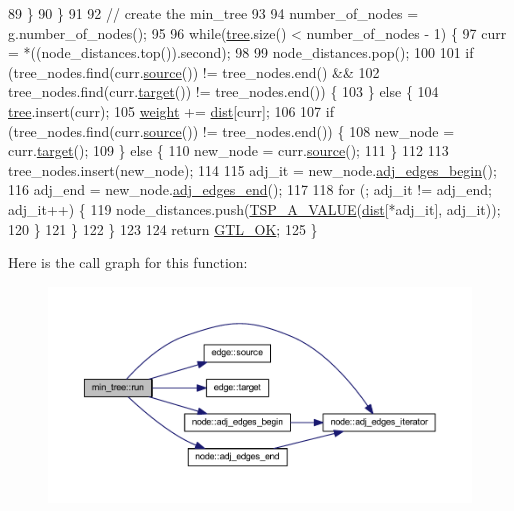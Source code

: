 \begin{DoxyCode}
89     \}  
90     \}
91 
92     \textcolor{comment}{// create the min\_tree}
93 
94     number\_of\_nodes = \mbox{\hyperlink{rings_8cpp_aa9df5aa3976a89a96a5f1c7611d42938}{g}}.number\_of\_nodes();
95 
96     \textcolor{keywordflow}{while}(\mbox{\hyperlink{classmin__tree_a138e9248f851ee2562df6644626a1f0b}{tree}}.size() < number\_of\_nodes - 1) \{ 
97     curr = *((node\_distances.top()).second);
98   
99     node\_distances.pop();
100  
101     \textcolor{keywordflow}{if} (tree\_nodes.find(curr.\mbox{\hyperlink{classedge_ae82d5701f7e6f71edc3c8b0e34bcd2b7}{source}}()) != tree\_nodes.end() && 
102         tree\_nodes.find(curr.\mbox{\hyperlink{classedge_a97563b611261478ee19c6ce055f1a3ee}{target}}()) != tree\_nodes.end()) \{
103     \} \textcolor{keywordflow}{else} \{
104         \mbox{\hyperlink{classmin__tree_a138e9248f851ee2562df6644626a1f0b}{tree}}.insert(curr);
105         \mbox{\hyperlink{classmin__tree_a52112da027b950d45c177117444c5010}{weight}} += \mbox{\hyperlink{classmin__tree_ae612767aa8e3eb3bedd1dadd7c68f99c}{dist}}[curr];
106 
107         \textcolor{keywordflow}{if} (tree\_nodes.find(curr.\mbox{\hyperlink{classedge_ae82d5701f7e6f71edc3c8b0e34bcd2b7}{source}}()) != tree\_nodes.end()) \{ 
108         new\_node = curr.\mbox{\hyperlink{classedge_a97563b611261478ee19c6ce055f1a3ee}{target}}();
109         \} \textcolor{keywordflow}{else} \{ 
110         new\_node = curr.\mbox{\hyperlink{classedge_ae82d5701f7e6f71edc3c8b0e34bcd2b7}{source}}();
111         \}
112 
113         tree\_nodes.insert(new\_node);
114         
115         adj\_it = new\_node.\mbox{\hyperlink{classnode_a788d3e932a5c164caa5ec82aa47551b2}{adj\_edges\_begin}}();
116         adj\_end = new\_node.\mbox{\hyperlink{classnode_aa1e7887d29390297580769454f769ad6}{adj\_edges\_end}}();
117         
118         \textcolor{keywordflow}{for} (; adj\_it != adj\_end; adj\_it++) \{ 
119         node\_distances.push(\mbox{\hyperlink{classmin__tree_af83e196caf3ebcdc9035dc42aee581ee}{TSP\_A\_VALUE}}(\mbox{\hyperlink{classmin__tree_ae612767aa8e3eb3bedd1dadd7c68f99c}{dist}}[*adj\_it], adj\_it));
120         \}   
121     \}
122     \}
123 
124     \textcolor{keywordflow}{return} \mbox{\hyperlink{classalgorithm_af1a0078e153aa99c24f9bdf0d97f6710a5114c20e4a96a76b5de9f28bf15e282b}{GTL\_OK}};
125 \}
\end{DoxyCode}
Here is the call graph for this function\+:\nopagebreak
\begin{figure}[H]
\begin{center}
\leavevmode
\includegraphics[width=350pt]{classmin__tree_ac025e8dad0db7a6a1e0e7b476b547802_cgraph}
\end{center}
\end{figure}
